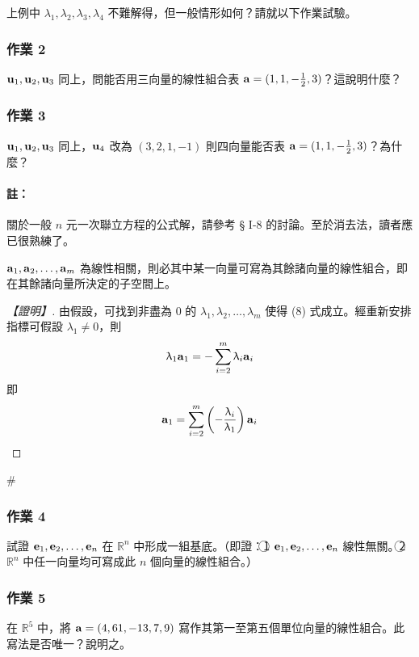 上例中 $\lambda_1, \lambda_2, \lambda_3, \lambda_4$ 不難解得，但一般情形如何？請就以下作業試驗。

\subsubsection*{作業 2}\label{hw:b6s-1-2}
$\boldsymbol{\mathbf{u}}_1, \boldsymbol{\mathbf{u}}_2, \boldsymbol{\mathbf{u}}_3$ 同上，問能否用三向量的線性組合表 $\boldsymbol{\mathbf{a}}=(1, 1, -\frac{1}{2}, 3)$？這說明什麼？

\subsubsection*{作業 3}\label{hw:b6s-1-3}
$\boldsymbol{\mathbf{u}}_1, \boldsymbol{\mathbf{u}}_2, \boldsymbol{\mathbf{u}}_3$ 同上，$\boldsymbol{\mathbf{u}}_4$ 改為 $(3, 2, 1, -1)$ 則四向量能否表 $\boldsymbol{\mathbf{a}}=(1, 1, -\frac{1}{2}, 3)$？為什麼？

\paragraph{註：}關於一般 $n$ 元一次聯立方程的公式解，請參考 § I-8 的討論。至於消去法，讀者應已很熟練了。

\begin{theorem}\label{thm:b6s-1-1}
$\boldsymbol{\mathbf{a}}_1, \boldsymbol{\mathbf{a}}_2, \dots, \boldsymbol{\mathbf{a}}_m$ 為線性相關，則必其中某一向量可寫為其餘諸向量的線性組合，即在其餘諸向量所決定的子空間上。
\end{theorem}

\begin{proof}[【證明】]
由假設，可找到非盡為 0 的 $\lambda_1, \lambda_2, \dots, \lambda_m$ 使得 (8) 式成立。經重新安排指標可假設 $\lambda_1 \ne 0$，則
\[ \uplambda_1 \boldsymbol{\mathbf{a}}_1 = - \sum_{i=2}^m \uplambda_i \boldsymbol{\mathbf{a}}_i \]
即
\[ \boldsymbol{\mathbf{a}}_1 = \sum_{i=2}^m \left(-\dfrac{\uplambda_i}{\uplambda_1}\right) \boldsymbol{\mathbf{a}}_i \]
\end{proof}\hfill$\#$

\subsubsection*{作業 4}\label{hw:b6s-1-4}
試證 $\boldsymbol{\mathbf{e}}_1, \boldsymbol{\mathbf{e}}_2, \dots, \boldsymbol{\mathbf{e}}_n$ 在 $\mathbb{R}^n$ 中形成一組基底。（即證：\textcircled{1} $\boldsymbol{\mathbf{e}}_1, \boldsymbol{\mathbf{e}}_2, \dots, \boldsymbol{\mathbf{e}}_n$ 線性無關。\textcircled{2} $\mathbb{R}^n$ 中任一向量均可寫成此 $n$ 個向量的線性組合。）

\subsubsection*{作業 5}\label{hw:b6s-1-5}
在 $\mathbb{R}^5$ 中，將 $\boldsymbol{\mathbf{a}}=(4, 61, -13, 7, 9)$ 寫作其第一至第五個單位向量的線性組合。此寫法是否唯一？說明之。

